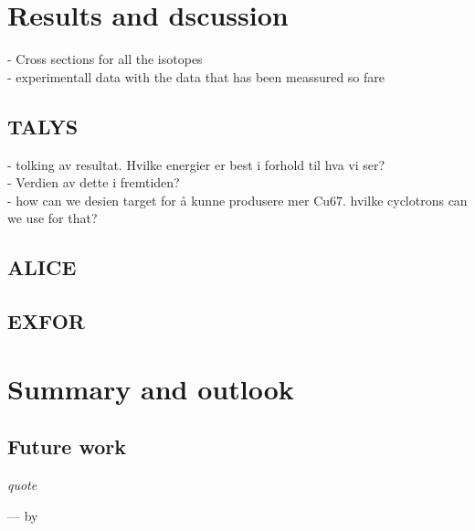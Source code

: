 \documentclass[twoside,english]{uiofysmaster/uiofysmaster}
\begin{document}

\chapter{Results and dscussion} 
\label{ch: res_and_discussion}
- Cross sections for all the isotopes\\
- experimentall data with the data that has been meassured so fare


\section{TALYS}
\label{sec: talys}


- tolking av resultat. Hvilke energier er best i forhold til hva vi ser?\\
- Verdien av dette i fremtiden?\\
- how can we  desien target for å kunne produsere mer Cu67. hvilke cyclotrons can we use for that? 

\section{ALICE}
\label{sec: alice}

\section{EXFOR}
\label{sec: exfor}






\chapter{Summary and outlook}
\label{sum_and_outlook}
\section{Future work}
\label{sec: future_work}


\epigraph{\itshape quote}{--- \textup by }
\end{document}

